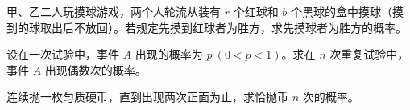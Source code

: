 \begin{homework}[1.34]
甲、乙二人玩摸球游戏，两个人轮流从装有 $r$ 个红球和 $b$ 个黑球的盒中摸球（摸到的球取出后不放回）。若规定先摸到红球者为胜方，求先摸球者为胜方的概率。
\end{homework}

\begin{homework}[1.35]
设在一次试验中，事件 $A$ 出现的概率为 $p\ (0<p<1)$。求在 $n$ 次重复试验中，事件 $A$ 出现偶数次的概率。
\end{homework}

\begin{homework}[1.36]
连续抛一枚匀质硬币，直到出现两次正面为止，求恰抛币 $n$ 次的概率。
\end{homework}



